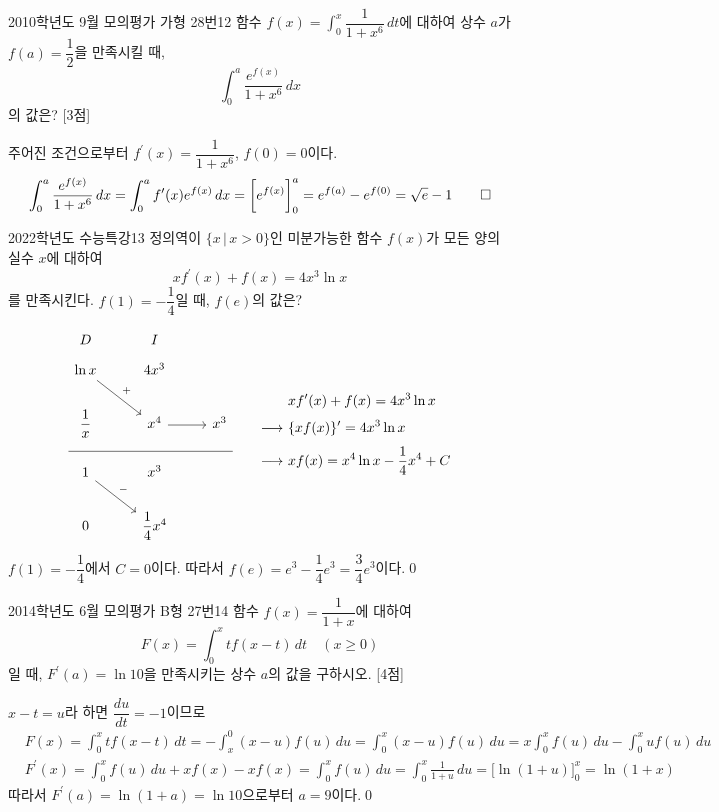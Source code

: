 \documentclass{article}
\begin{document}
\newpage
\begin{prob}{2010학년도 9월 모의평가 가형 28번}{12}
	함수 $f(x)=\displaystyle\int_0^x\dfrac{1}{1+x^6}\,dt$에 대하여 상수 $a$가 $f(a)=\dfrac{1}{2}$을 만족시킬 때,
	\[
		\int_0^a\frac{e^{f(x)}}{1+x^6}\,dx
	\]
	의 값은? [3점]
\end{prob}

\begin{sol}
	주어진 조건으로부터 $f^{\prime}(x)=\dfrac{1}{1+x^6}$, $f(0)=0$이다.
	\[
		\int_0^a\frac{e^{f(x)}}{1+x^6}\,dx=\int_0^af^{\prime}(x)e^{f(x)}\,dx=\biggl[e^{f(x)}\biggr]_0^a=e^{f(a)}-e^{f(0)}=\sqrt e-1\qed
	\]
\end{sol}

\newpage
\begin{prob}{2022학년도 수능특강}{13}
	정의역이 $\{x\,\vert\,x>0\}$인 미분가능한 함수 $f(x)$가 모든 양의 실수 $x$에 대하여
	\[
		xf^{\prime}(x)+f(x)=4x^3\ln x
	\]
	를 만족시킨다. $f(1)=-\dfrac{1}{4}$일 때, $f(e)$의 값은?
\end{prob}

\begin{sol}
	\[
		\begin{tikzcd}
			D & I & \\[-12pt]
			\ln x \arrow[rd, "+"] & 4x^3 & \\
			\dfrac{1}{x} & x^4 \arrow[r] & x^3 \\[-12pt] \hline \\[-12pt]
			1 \arrow[rd, "-"] & x^3 & \\
			0 & \dfrac{1}{4}x^4 &
		\end{tikzcd}\qquad\begin{aligned}
			&xf^{\prime}(x)+f(x)=4x^3\ln x\\[3pt]
			\longrightarrow~&\{xf(x)\}^{\prime}=4x^3\ln x\\[3pt]
			\longrightarrow~&xf(x)=x^4\ln x-\dfrac{1}{4}x^4+C
		\end{aligned}
	\]
	$f(1)=-\dfrac{1}{4}$에서 $C=0$이다. 따라서 $f(e)=e^3-\dfrac{1}{4}e^3=\dfrac{3}{4}e^3$이다.\qed
\end{sol}

\newpage
\begin{prob}{2014학년도 6월 모의평가 B형 27번}{14}
	함수 $f(x)=\dfrac{1}{1+x}$에 대하여
	\[
		F(x)=\int_0^xtf(x-t)\,dt\quad(x\geq0)
	\]
	일 때, $F^{\prime}(a)=\ln10$을 만족시키는 상수 $a$의 값을 구하시오. [4점]
\end{prob}

\begin{sol}[풀이 1]
	$x-t=u$라 하면 $\dfrac{du}{dt}=-1$이므로
	\begin{align*}
		&F(x)=\int_0^xtf(x-t)\,dt=-\int_x^0(x-u)f(u)\,du=\int_0^x(x-u)f(u)\,du=x\int_0^xf(u)\,du-\int_0^xuf(u)\,du\\[3pt]
		&F^{\prime}(x)=\int_0^xf(u)\,du+xf(x)-xf(x)=\int_0^xf(u)\,du=\int_0^x\frac{1}{1+u}\,du=\biggl[\ln(1+u)\biggr]_0^x=\ln(1+x)
	\end{align*}
	따라서 $F^{\prime}(a)=\ln(1+a)=\ln10$으로부터 $a=9$이다.\qed
\end{sol}
\end{document}
